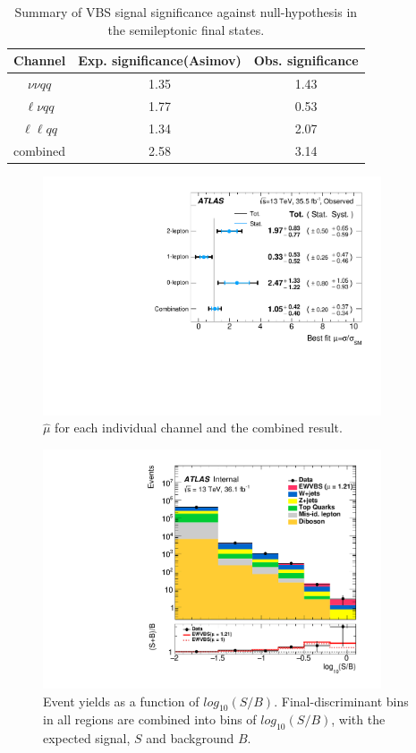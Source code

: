 \begin{table}[htb] 
	\centering
	\begin{tabular}{ccc}
		\hline
		Channel  & Exp. significance(Asimov) & Obs. significance  \\ 
		\hline
		$\nu\nu qq$ & 1.35 & 1.43 \\
		$\ell\nu qq$ & 1.77 & 0.53 \\
		$\ell\ell qq$ & 1.34 & 2.07 \\
		combined & 2.58  & 3.14 \\
		\hline 
	\end{tabular}
	\caption{Summary of VBS signal significance against null-hypothesis in the semileptonic final states.}
	\label{tab:significance_sbfit_obs}  
\end{table}
\begin{figure}[!h]
	\begin{centering}
		\includegraphics[width=10cm]{Chapter5/Muhat_VBS_channels_obs.pdf} 
		\caption{$\hat{\mu}$ for each individual channel and the combined result.}
		\label{fig:fit_mu_VBS_obs}  
	\end{centering}
\end{figure}
\begin{figure}[!h]
	\begin{centering}
		\includegraphics[width=10cm]{Chapter5/Global_SoverB_2016.pdf} 
		\caption{Event yields as a function of $log_{10}(S/B)$. Final-discriminant bins in all regions are combined into bins of
			$log_{10}(S/B)$, with the expected signal, $S$ and background $B$.}
		\label{fig:SoBplot_obs}  
	\end{centering}
\end{figure}
